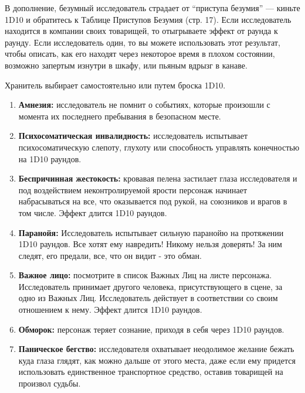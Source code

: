 \documentclass[letterpaper,twocolumn,openany, twoside, 11pt, usenames]{cocbook}
\begin{document}
В дополнение, безумный исследователь страдает от ``приступа безумия'' --- киньте 1D10 и обратитесь к Таблице Приступов Безумия (стр. 17). Если исследователь находится в компании своих товарищей, то отыгрываете эффект от раунда к раунду. Если исследователь один, то вы можете использовать этот результат, чтобы описать, как его находят через некоторое время в плохом состоянии, возможно запертым изнутри в шкафу, или пьяным вдрызг в канаве.
\begin{fullcocpaperbox}{}{}
  Хранитель выбирает самостоятельно или путем броска 1D10.
  \begin{multicols}{2}
  \begin{enumerate}
    \item \textbf{Амнезия:} исследователь не помнит о событиях, которые произошли с момента их последнего пребывания в безопасном месте.
    \item \textbf{Психосоматическая инвалидность:} исследователь испытывает психосоматическую слепоту, глухоту или способность управлять конечностью на 1D10 раундов.
    \item \textbf{Беспричинная жестокость:} кровавая пелена застилает глаза исследователя и под воздействием неконтролируемой ярости персонаж начинает набрасываться на все, что оказывается под рукой, на союзников и врагов в том числе. Эффект длится 1D10 раундов.
    \item \textbf{Паранойя:} Исследователь испытывает сильную паранойю на протяжении 1D10 раундов. Все хотят ему навредить! Никому нельзя доверять! За ним следят, его предали, все, что он видит - это обман.
    \item \textbf{Важное лицо:} посмотрите в список Важных Лиц на листе персонажа. Исследователь принимает другого человека, присутствующего в сцене, за одно из Важных Лиц. Исследователь действует в соответствии со своим отношением к нему. Эффект длится 1D10 раундов.
    \item \textbf{Обморок:} персонаж теряет сознание, приходя в себя через 1D10 раундов.
    \item \textbf{Паническое бегство:} исследователя охватывает неодолимое желание бежать куда глаза глядят, как можно дальше от этого места, даже если ему придется использовать единственное транспортное средство, оставив товарищей на произвол судьбы.

\end{enumerate}
\end{multicols}
\end{fullcocpaperbox}
\end{document}
